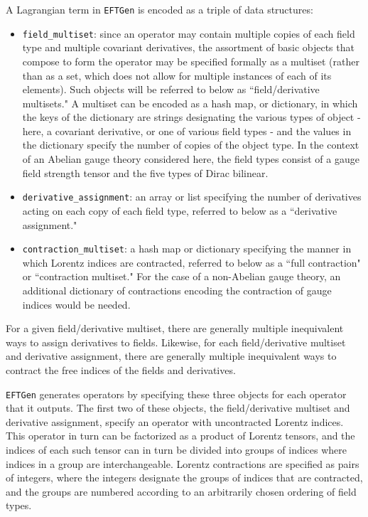 \documentclass[11pt,BCOR=5mm]{article}
\begin{document}
A Lagrangian term in \texttt{EFTGen} is encoded as a triple of data structures: 

\begin{itemize}
\item \texttt{field\_multiset}: since an operator may contain multiple copies of each field type and multiple covariant derivatives, the assortment of basic objects that compose to form the operator may be specified formally as a multiset (rather than as a set, which does not allow for multiple instances of each of its elements). Such objects will be referred to below as ``field/derivative multisets." A multiset can be encoded as a hash map, or dictionary, in which the keys of the dictionary are strings designating the various types of object  - here, a covariant derivative, or one of various field types - and the values in the dictionary specify the number of copies of the object type. In the context of an Abelian gauge theory considered here, the field types consist of a gauge field strength tensor and the five types of Dirac bilinear. 
\item \texttt{derivative\_assignment}: an array or list specifying the number of derivatives acting on each copy of each field type, referred to below as a ``derivative assignment."
\item \texttt{contraction\_multiset}: a hash map or dictionary specifying the manner in which Lorentz indices are contracted, referred to below as a ``full contraction" or ``contraction multiset." For the case of a non-Abelian gauge theory, an additional dictionary of contractions encoding the contraction of gauge indices would be needed. 
\end{itemize}

\noindent For a given field/derivative multiset, there are generally multiple inequivalent ways to assign derivatives to fields. Likewise, for each field/derivative multiset and derivative assignment, there are generally multiple inequivalent ways to contract the free indices of the fields and derivatives. 

\texttt{EFTGen} generates operators by specifying these three objects for each operator that it outputs. The first two of these objects, the field/derivative multiset and derivative assignment, specify an operator with uncontracted Lorentz indices. This operator in turn can be factorized as a product of Lorentz tensors, and the indices of each such tensor can in turn be divided into groups of indices where indices in a group are interchangeable. Lorentz contractions are specified as pairs of integers, where the integers designate the groups of indices that are contracted, and the groups are numbered according to an arbitrarily chosen ordering of field types. 
\end{document}
